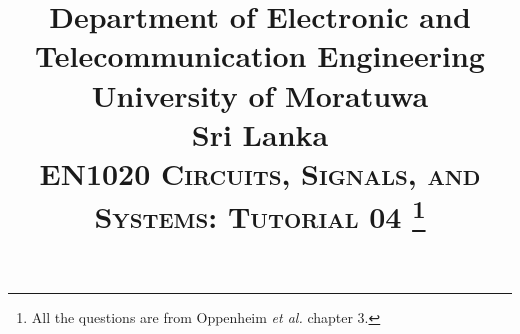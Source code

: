 \documentclass[12pt]{article}
\begin{document}


\title{\Large Department of Electronic and Telecommunication Engineering\\University of Moratuwa\\Sri Lanka\\{\LARGE \bf \textsc{EN1020 Circuits, Signals, and Systems: Tutorial 04 \footnote{All the questions are from Oppenheim \emph{et al.} chapter 3.}}}}

\maketitle
\end{document}
